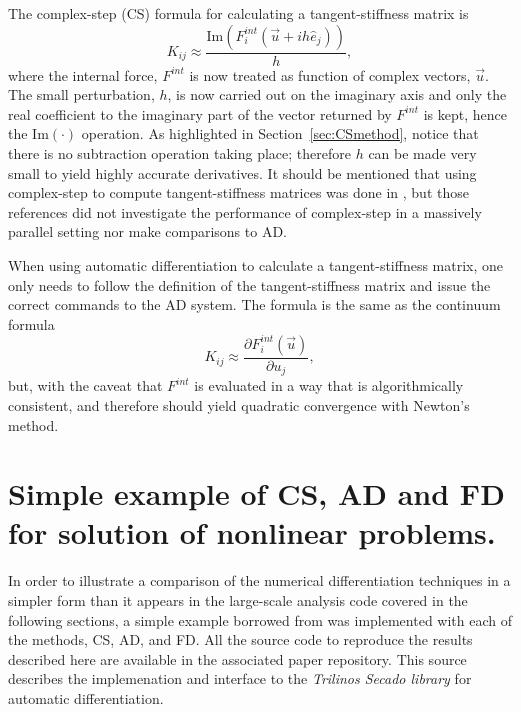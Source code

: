 \documentclass[preprint,12pt]{elsarticle}
\begin{document}
The complex-step (CS) formula for calculating a tangent-stiffness matrix is
%
\begin{equation} K_{ij} \approx \frac{\mbox{Im}(F_i^{int}(\vec{u} + i h
\hat{e}_j))}{h}, \end{equation}
%
where the internal force, $F^{int}$ is now treated as function of complex vectors,  $\vec{u}$. The small perturbation, $h$, is now carried out on the imaginary axis and only the real coefficient to the imaginary part of the vector returned by $F^{int}$ is kept, hence the $\mbox{Im}(\cdot)$ operation.  As highlighted in Section~\ref{sec:CSmethod}, notice that there is no subtraction operation taking place; therefore $h$ can be made very small to yield highly accurate derivatives. It should be mentioned that using complex-step to compute tangent-stiffness matrices was done in \cite{perez2000numerical,perez2012numerical}, but those references did not
investigate the performance of complex-step in a massively parallel setting nor make comparisons to AD. 

When using automatic differentiation to calculate a tangent-stiffness matrix, one only needs to follow the definition of the tangent-stiffness matrix and issue the correct commands to the AD system. The formula is the same as the continuum formula
%
\begin{equation} K_{ij} \approx \frac{\partial F_i^{int}(\vec{u})}{\partial u_j},
\end{equation}
%
but, with the caveat that $F^{int}$ is evaluated in a way that is algorithmically consistent, and therefore should yield quadratic convergence with Newton's method.

\section{Simple example of CS, AD and FD for solution of nonlinear problems.}
\label{sec:WorkingExamples}

In order to illustrate a comparison of the numerical differentiation techniques in a simpler form than it appears in the large-scale analysis code covered in the following sections, a simple example borrowed from \cite{rezaiee2010dynamic} was implemented with each of the methods, CS, AD, and FD. All the source code to reproduce the results described here are available in the associated paper repository. This source describes the implemenation and interface to the \emph{Trilinos Secado library} for automatic differentiation.
\end{document}
